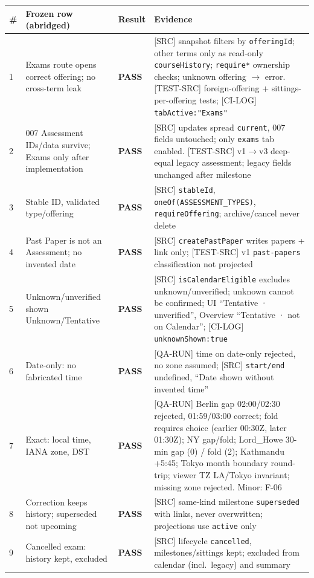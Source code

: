 \documentclass[11pt,a4paper]{article}
\newcommand{\PASS}{\textcolor{green!50!black}{\textbf{PASS}}}
\begin{document}
{\small
\begin{longtable}{@{}p{0.5cm}p{4.3cm}p{1.6cm}p{9.3cm}@{}}
\toprule
\# & Frozen row (abridged) & Result & Evidence \\
\midrule
\endhead
1 & Exams route opens correct offering; no cross-term leak & \PASS & [SRC] snapshot filters by \texttt{offeringId}; other terms only as read-only \texttt{courseHistory}; \texttt{require*} ownership checks; unknown offering $\to$ error. [TEST-SRC] foreign-offering + sittings-per-offering tests; [CI-LOG] \texttt{tabActive:"Exams"} \\
2 & 007 Assessment IDs/data survive; Exams only after implementation & \PASS & [SRC] updates spread \texttt{current}, 007 fields untouched; only \texttt{exams} tab enabled. [TEST-SRC] v1$\to$v3 deep-equal legacy assessment; legacy fields unchanged after milestone \\
3 & Stable ID, validated type/offering & \PASS & [SRC] \texttt{stableId}, \texttt{oneOf(ASSESSMENT\_TYPES)}, \texttt{requireOffering}; archive/cancel never delete \\
4 & Past Paper is not an Assessment; no invented date & \PASS & [SRC] \texttt{createPastPaper} writes papers + link only; [TEST-SRC] v1 \texttt{past-papers} classification not projected \\
5 & Unknown/unverified shown Unknown/Tentative & \PASS & [SRC] \texttt{isCalendarEligible} excludes unknown/unverified; unknown cannot be confirmed; UI ``Tentative · unverified'', Overview ``Tentative · not on Calendar''; [CI-LOG] \texttt{unknownShown:true} \\
6 & Date-only: no fabricated time & \PASS & [QA-RUN] time on date-only rejected, no zone assumed; [SRC] \texttt{start/end} undefined, ``Date shown without invented time'' \\
7 & Exact: local time, IANA zone, DST & \PASS & [QA-RUN] Berlin gap 02:00/02:30 rejected, 01:59/03:00 correct; fold requires choice (earlier 00:30Z, later 01:30Z); NY gap/fold; Lord\_Howe 30-min gap (0) / fold (2); Kathmandu +5:45; Tokyo month boundary round-trip; viewer TZ LA/Tokyo invariant; missing zone rejected. Minor: F-06 \\
8 & Correction keeps history; superseded not upcoming & \PASS & [SRC] same-kind milestone \texttt{superseded} with links, never overwritten; projections use \texttt{active} only \\
9 & Cancelled exam: history kept, excluded & \PASS & [SRC] lifecycle \texttt{cancelled}, milestones/sittings kept; excluded from calendar (incl.\ legacy) and summary \\

\end{longtable}}
\end{document}
